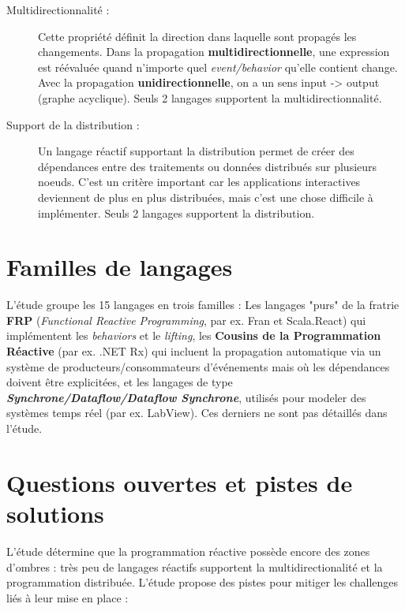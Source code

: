 \documentclass[10pt,final]{IEEEtran}
\begin{document}
\begin{description}
    \item[Multidirectionnalité :]
    Cette propriété définit la direction dans laquelle sont propagés les changements. Dans la propagation \textbf{multidirectionnelle}, une expression est réévaluée quand n'importe quel \textit{event/behavior} qu'elle contient change. Avec la propagation \textbf{unidirectionnelle}, on a un sens input -> output (graphe acyclique). Seuls 2 langages supportent la multidirectionnalité.
    
    \item[Support de la distribution :]
    Un langage réactif supportant la distribution permet de créer des dépendances entre des traitements ou données distribués sur plusieurs noeuds. C'est un critère important car les applications interactives deviennent de plus en plus distribuées, mais c'est une chose difficile à implémenter. Seuls 2 langages supportent la distribution.
\end{description}


\section{Familles de langages}

L'étude groupe les 15 langages en trois familles : Les langages "purs" de la fratrie \textbf{FRP} (\textit{Functional Reactive Programming}, par ex. Fran et Scala.React) qui implémentent les \textit{behaviors} et le \textit{lifting}, les \textbf{Cousins de la Programmation Réactive} (par ex. .NET Rx) qui incluent la propagation automatique via un système de producteurs/consommateurs d'événements mais où les dépendances doivent être explicitées, et les langages de type \textit{\textbf{Synchrone/Dataflow/Dataflow Synchrone}}, utilisés pour modeler des systèmes temps réel (par ex. LabView). Ces derniers ne sont pas détaillés dans l'étude.

\section{Questions ouvertes et pistes de solutions}
 
L'étude détermine que la programmation réactive possède encore des zones d'ombres : très peu de langages réactifs supportent la multidirectionalité et la programmation distribuée. L'étude propose des pistes pour mitiger les challenges liés à leur mise en place :
\end{document}
